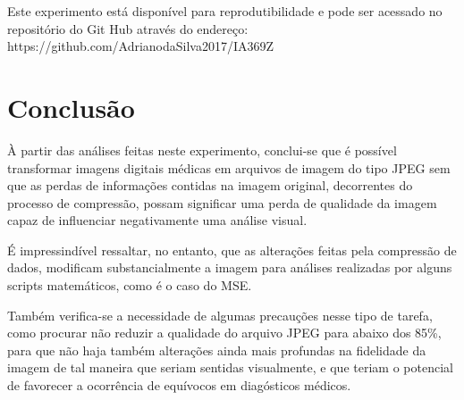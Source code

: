 \documentclass{IEEEtran}
\begin{document}
    Este experimento está disponível para reprodutibilidade e pode ser
acessado no repositório do Git Hub através do endereço:
https://github.com/AdrianodaSilva2017/IA369Z 

    \section{Conclusão}\label{conclusuxe3o}

    À partir das análises feitas neste experimento, conclui-se que é
possível transformar imagens digitais médicas em arquivos de imagem do
tipo JPEG sem que as perdas de informações contidas na imagem original,
decorrentes do processo de compressão, possam significar uma perda de
qualidade da imagem capaz de influenciar negativamente uma análise
visual.

É impressindível ressaltar, no entanto, que as alterações feitas pela
compressão de dados, modificam substancialmente a imagem para análises
realizadas por alguns scripts matemáticos, como é o caso do MSE.

Também verifica-se a necessidade de algumas precauções nesse tipo de
tarefa, como procurar não reduzir a qualidade do arquivo JPEG para
abaixo dos 85\%, para que não haja também alterações ainda mais
profundas na fidelidade da imagem de tal maneira que seriam sentidas
visualmente, e que teriam o potencial de favorecer a ocorrência de
equívocos em diagósticos médicos. 



    
    



    
    
\end{document}
